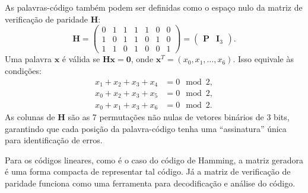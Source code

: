 As palavras-código também podem ser definidas como o espaço nulo da matriz de verificação de paridade $\mathbf{H}$:
\begin{equation}
\mathbf{H} = \begin{pmatrix}
0 & 1 & 1 & 1 & 1 & 0 & 0 \\
1 & 0 & 1 & 1 & 0 & 1 & 0 \\
1 & 1 & 0 & 1 & 0 & 0 & 1
\end{pmatrix} = \begin{pmatrix} \mathbf{P} & \mathbf{I}_3 \end{pmatrix}.
\end{equation}
Uma palavra $\mathbf{x}$ é válida se $\mathbf{H} \mathbf{x} = \mathbf{0}$, onde $\mathbf{x}^T = (x_0, x_1, \dots, x_6)$. 
Isso equivale às condições:
\begin{subequations}
\begin{align}
x_1 + x_2 + x_3 + x_4 &= 0 \mod 2, \label{eq:hamming_check1} \\
x_0 + x_2 + x_3 + x_5 &= 0 \mod 2, \label{eq:hamming_check2} \\
x_0 + x_1 + x_3 + x_6 &= 0 \mod 2. \label{eq:hamming_check3}
\end{align}
\end{subequations}
As colunas de $\mathbf{H}$ são as 7 permutações não nulas de vetores binários
de 3 bits, garantindo que cada posição da palavra-código tenha uma ``assinatura''
única para identificação de erros.

Para os códigos lineares, como é o caso do código de Hamming, a matriz geradora
é uma forma compacta de representar tal código. Já a matriz de verificação de
paridade funciona como uma ferramenta para decodificação e análise do código.


